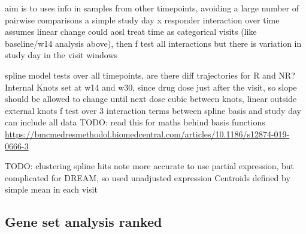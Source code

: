 \begin{outline}
\1 aim is to uses info in samples from other timepoints, avoiding a large number of pairwise comparisons
    \2 a simple study day x responder interaction over time assumes linear change
\1 could aosl treat time as categorical visits (like baseline/w14 analysis above), then f test all interactions
    \2 but there is variation in study day in the visit windows

\1 spline model tests over all timepoints, are there diff trajectories for R and NR?
    \2 Internal Knots set at w14 and w30, since drug dose just after the visit, so slope should be allowed to change until next dose
    \2 cubic between knots, linear outside external knots
    \2 f test over 3 interaction terms between spline basis and study day
        \3 can include all data
        \3 TODO: read this for maths behind basis functions \url{https://bmcmedresmethodol.biomedcentral.com/articles/10.1186/s12874-019-0666-3}


\1 TODO: clustering spline hits
    \2 note more accurate to use partial expression, but complicated for DREAM, so used unadjusted expression
    \2 Centroids defined by simple mean in each visit

\subsection{Gene set analysis ranked}


\end{outline}
